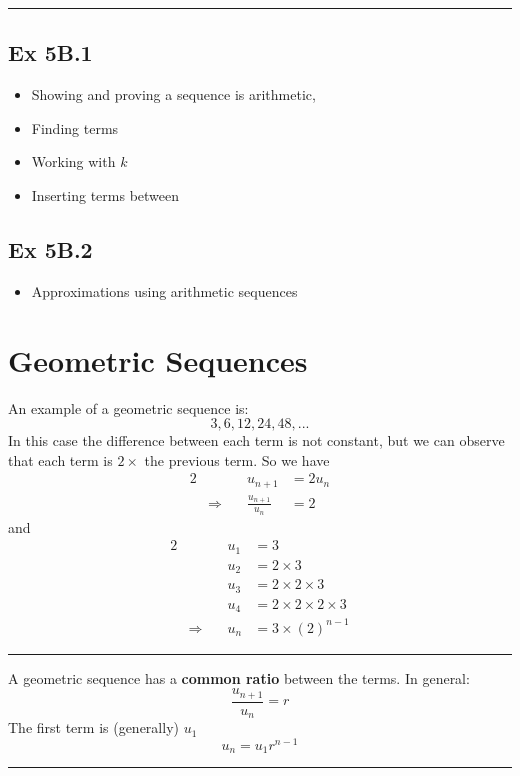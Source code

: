 \documentclass[12pt]{article}
\begin{document}
\vspace{0.5cm}\hrule

	
\subsection{Ex 5B.1}
\begin{itemize}
	\item Showing and proving a sequence is arithmetic, 
	\item Finding terms 
	\item Working with $k$
	\item Inserting terms between
\end{itemize}
 
\subsection{Ex 5B.2}
\begin{itemize}
	\item Approximations using arithmetic sequences
\end{itemize}
\newpage
\section{Geometric  Sequences}
An example of a geometric sequence is:
\LARGE $$3,6,12, 24, 48,...$$ \normalsize
In this case the difference between each term is not constant, but we can observe that each term is $2 \times$ the previous term.
So we have 
\begin{alignat*}{2}
&\qquad &u_{n+1} &= 2u_n\\
	&\Rightarrow& \frac{ u_{n+1} }{ u_n }&= 2
\end{alignat*}
and 
\begin{alignat*}{2}
	&\qquad &u_{1} &= 3\\
	&& u_2&= 2\times 3\\
	&& u_3&= 2\times 2\times 3\\
	&& u_4&=  2\times2\times 2\times 3\\
	&\Rightarrow&u_n&= 3\times(2)^{n-1}
\end{alignat*}
\hrule\vspace{0.5cm}
A geometric sequence has a \textbf{common ratio} between the terms.
In general:
$$\frac{ u_{n+1} }{ u_n } = r$$
The first term is (generally) $u_1$
\LARGE$$u_n = u_1 r^{n-1}$$\normalsize
\vspace{0.5cm}\hrule
\end{document}
